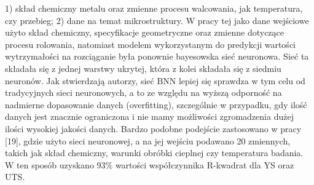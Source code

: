1) skład chemiczny metalu oraz zmienne procesu walcowania, jak temperatura, czy przebieg;
2) dane na temat mikrostruktury. 
W pracy tej jako dane wejściowe użyto skład chemiczny, specyfikacje geometryczne oraz zmienne dotyczące procesu rolowania, natomiast modelem wykorzystanym do predykcji wartości wytrzymałości na rozciąganie była ponownie bayesowska sieć neuronowa. Sieć ta składała się z jednej warstwy ukrytej, która z kolei składała się z siedmiu neuronów. Jak stwierdzają autorzy, sieć BNN lepiej się sprawdza w tym celu od tradycyjnych sieci neuronowych, a to ze względu na wyższą odporność na nadmierne dopasowanie danych (overfitting), szczególnie w przypadku, gdy ilość danych jest znacznie ograniczona i nie mamy możliwości zgromadzenia dużej ilości wysokiej jakości danych.
    Bardzo podobne podejście zastosowano w pracy [19], gdzie użyto sieci neuronowej, a na jej wejściu podawano 20 zmiennych, takich jak skład chemiczny, warunki obróbki cieplnej czy temperatura badania. W ten sposób uzyskano 93\% wartości współczynnika R-kwadrat dla YS oraz UTS.
















